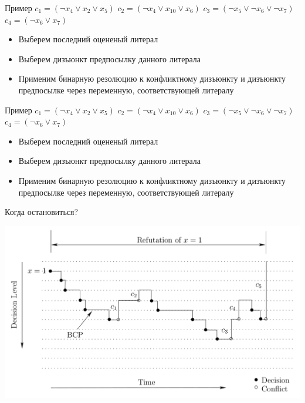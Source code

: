 \documentclass{beamer}
\begin{document}
\begin{frame}{Пример}
$c_1 = (\lnot x_4 \vee x_2 \vee x_5)$\newline
$c_2 = (\lnot x_4 \vee x_{10} \vee x_6)$\newline
$c_3 = (\lnot x_5 \vee \lnot x_6 \vee \lnot x_7)$\newline
$c_4 = (\lnot x_6 \vee x_7)$\newline
\begin{itemize}
\item Выберем последний оцененый литерал
\item Выберем дизъюнкт предпосылку данного литерала
\item Применим бинарную резолюцию к конфликтному дизъюнкту и дизъюнкту предпосылке через переменную, соответствующей литералу
\end{itemize}
\end{frame}

\begin{frame}{Пример}
$c_1 = (\lnot x_4 \vee x_2 \vee x_5)$\newline
$c_2 = (\lnot x_4 \vee x_{10} \vee x_6)$\newline
$c_3 = (\lnot x_5 \vee \lnot x_6 \vee \lnot x_7)$\newline
$c_4 = (\lnot x_6 \vee x_7)$\newline
\begin{itemize}
\item Выберем последний оцененый литерал
\item Выберем дизъюнкт предпосылку данного литерала
\item Применим бинарную резолюцию к конфликтному дизъюнкту и дизъюнкту предпосылке через переменную, соответствующей литералу
\end{itemize}
Когда остановиться?
\end{frame}

\begin{frame}{}
\includegraphics[scale=0.25]{Graph.png}
\end{frame}
\end{document}
